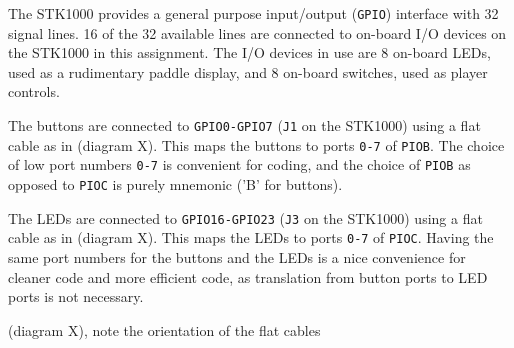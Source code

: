The STK1000 provides a general purpose input/output (\texttt{GPIO}) interface with 32 signal lines.
16 of the 32 available lines are connected to on-board I/O devices on the STK1000 in this assignment.
The I/O devices in use are 8 on-board LEDs, used as a rudimentary paddle display, and 8 on-board switches, used as player controls.

The buttons are connected to \texttt{GPIO0-GPIO7} (\texttt{J1} on the STK1000) using a flat cable as in (diagram X). This maps the buttons to ports \texttt{0-7} of \texttt{PIOB}.
The choice of low port numbers \texttt{0-7} is convenient for coding, and the choice of \texttt{PIOB} as opposed to \texttt{PIOC} is purely mnemonic ('B' for buttons).

The LEDs are connected to \texttt{GPIO16-GPIO23} (\texttt{J3} on the STK1000) using a flat cable as in (diagram X). This maps the LEDs to ports \texttt{0-7} of \texttt{PIOC}.
Having the same port numbers for the buttons and the LEDs is a nice convenience for cleaner code and more efficient code, as translation from button ports to LED ports is not necessary.

(diagram X), note the orientation of the flat cables
